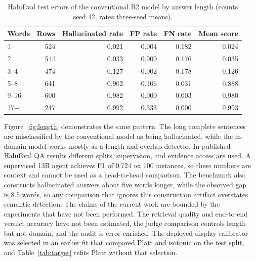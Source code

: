 \documentclass[a4paper,fleqn]{cas-sc}
\begin{document}
\begin{table}[pos=htbp]
  \centering
  \caption{HaluEval test errors of the conventional B2 model by answer length (counts seed 42, rates three-seed means).}
  \label{tab:length}
  \begin{tabular}{lrrrrr}
    \toprule
    \textbf{Words} & \textbf{Rows} & \textbf{Hallucinated rate} & \textbf{FP rate} & \textbf{FN rate} & \textbf{Mean score} \\
    \midrule
    1              & 524           & 0.021                      & 0.004            & 0.182            & 0.024               \\
    2              & 514           & 0.033                      & 0.000            & 0.176            & 0.035               \\
    3--4           & 474           & 0.127                      & 0.002            & 0.178            & 0.126               \\
    5--8           & 641           & 0.902                      & 0.106            & 0.031            & 0.888               \\
    9--16          & 600           & 0.982                      & 0.000            & 0.003            & 0.980               \\
    17+            & 247           & 0.992                      & 0.333            & 0.000            & 0.993               \\
    \bottomrule
  \end{tabular}
\end{table}

Figure~\ref{fig:length} demonstrates the same pattern. The long complete sentences are misclassified by the conventional model as being hallucinated, while the in-domain model works mostly as a length and overlap detector. In published HaluEval QA results different splits, supervision, and evidence access are used. A supervised 13B agent achieves F1 of 0.724 on 100 instances, so these numbers are context and cannot be used as a head-to-head comparison. The benchmark also constructs hallucinated answers about five words longer, while the observed gap is 8.5 words, so any comparison that ignores this construction artifact overstates semantic detection. The claims of the current work are bounded by the experiments that have not been performed. The retrieval quality and end-to-end verdict accuracy have not been estimated, the judge comparison controls length but not domain, and the audit is error-enriched. The deployed display calibrator was selected in an earlier fit that compared Platt and isotonic on the test split, and Table~\ref{tab:target} refits Platt without that selection.
\end{document}
